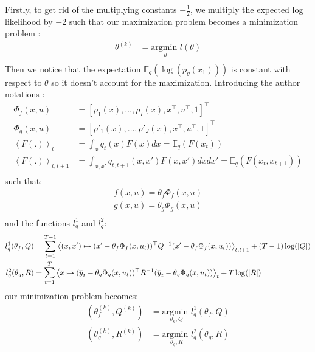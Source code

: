 Firstly, to get rid of the multiplying constants $-\frac{1}{2}$, we multiply the expected log likelihood by $-2$ such that our maximization problem becomes a minimization problem :
\begin{align*}
  \theta^{(k)} &= \underset{\theta}{\text{argmin }}l(\theta)\\
\end{align*}
Then we notice that the expectation $\mathbb{E}_q(\log(p_{\theta}(x_1)))$ is constant with respect to $\theta$ so it doesn't account for the maximization.
Introducing the author notations :
\begin{align*}
  \Phi_f(x, u) &= [\rho_1(x), \ldots , \rho_I(x), x^{\top}, u^{\top}, 1]^{\top}\\
  \Phi_g(x, u) &= [\rho'_1(x), \ldots , \rho'_J(x), x^{\top}, u^{\top}, 1]^{\top}\\
  \left< F(.) \right>_{t} &= \int_x{q_t(x) F(x) dx} = \mathbb{E}_q \left( F(x_t) \right)\\
  \left< F(.) \right>_{t,t+1} &= \int_{x, x'}{q_{t,t+1}(x, x') F(x,x') dx}dx' = \mathbb{E}_q \left( F(x_t, x_{t+1}) \right)\\
\end{align*} %
such that:
\begin{align*}
  f(x,u) = \theta_f \Phi_f(x, u)\\
  g(x,u) = \theta_g \Phi_g(x, u)\\
\end{align*}
and the functions $l^1_q$ and $l^2_q$:
\begin{align*}
  l^1_q(\theta_f, Q) &= \sum_{t=1}^{T-1}\left< (x, x') \mapsto (x' - \theta_f\Phi_f(x,u_t))^{\top} Q^{-1}(x' - \theta_f\Phi_f(x,u_t)) \right>_{t,t+1} + (T-1) \log( \mathbin{\vert} Q \mathbin{\vert} )
  \\
  l^2_q(\theta_g, R) &= \sum_{t=1}^{T}\left< x \mapsto (\overline{y}_{t} - \theta_g \Phi_g(x, u_t))^{\top} R^{-1} (\overline{y}_{t} - \theta_g \Phi_g(x, u_t)) \right>_{t} + T \log( \mathbin{\vert} R \mathbin{\vert} )
  \\
\end{align*}
our minimization problem becomes:
\begin{align*}
  \left(\theta_f^{(k)}, Q^{(k)}\right) &= \underset{\theta_k, Q}{\text{argmin }}l^1_q(\theta_f, Q)\\
  \left(\theta_g^{(k)}, R^{(k)}\right) &= \underset{\theta_g, R}{\text{argmin }}l^2_q(\theta_g, R)\\
\end{align*}

